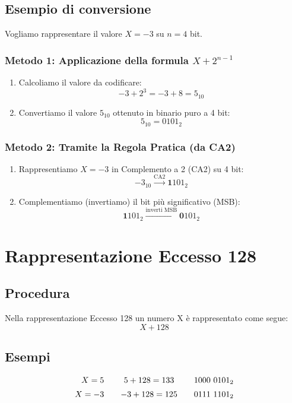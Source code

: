 \subsection{Esempio di conversione}
Vogliamo rappresentare il valore $X = -3$ su $n = 4$ bit.

\subsubsection{Metodo 1: Applicazione della formula $X + 2^{n-1}$}
\begin{enumerate}
    \item Calcoliamo il valore da codificare:
    $$ -3 + 2^{3} = -3 + 8 = 5_{10} $$
    \item Convertiamo il valore $5_{10}$ ottenuto in binario puro a 4 bit:
    $$ 5_{10} = 0101_2 $$
\end{enumerate}

\subsubsection{Metodo 2: Tramite la Regola Pratica (da CA2)}
\begin{enumerate}
    \item Rappresentiamo $X = -3$ in Complemento a 2 (CA2) su 4 bit:
    $$ -3_{10} \xrightarrow{\text{CA2}} \mathbf{1}101_2 $$
    \item Complementiamo (invertiamo) il bit più significativo (MSB):
    $$ \mathbf{1}101_2 \xrightarrow{\text{inverti MSB}} \mathbf{0}101_2 $$
\end{enumerate}

\newpage
\section{Rappresentazione Eccesso 128}
\subsection{Procedura}
Nella rappresentazione Eccesso 128 un numero X è rappresentato come segue:
$$
    X + 128
$$

\subsection{Esempi}

\[
\begin{array}{r@{\qquad}c@{\qquad}l}
    X = 5 & 5 + 128 = 133 & 1000\ 0101_2 \\[0.5em]
    X = -3 & -3 + 128 = 125 & 0111\ 1101_2
\end{array}
\]

